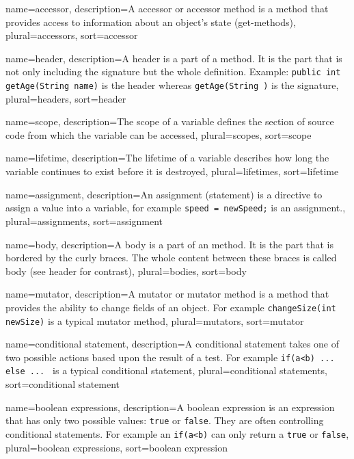 {
	name=accessor,
	description={A accessor or accessor method is a method that provides
		access to information about an object's state (get-methods)},
	plural=accessors,
	sort=accessor
}

{
	name=header,
	description={A header is a part of a method. It is the part that is
		not only including the signature but the whole definition.
		Example: \lstinline{public int getAge(String name)} is the
		header whereas \lstinline{getAge(String )} is the signature},
	plural=headers,
	sort=header
}

{
	name=scope,
	description={The scope of a variable defines the section of source
		code from which the variable can be accessed},
	plural=scopes,
	sort=scope
}

{
	name=lifetime,
	description={The lifetime of a variable describes how long the
		variable continues to exist before it is destroyed},
	plural=lifetimes,
	sort=lifetime
}

{
	name=assignment,
	description={An assignment (statement) is a directive to assign a
		value into a variable, for example 
		\lstinline{speed = newSpeed;} is an assignment.},
	plural=assignments,
	sort=assignment
}

{
	name=body,
	description={A body is a part of an method. It is the part that is
		bordered by the curly braces. The whole content between these
		braces is called body (see header for contrast)},
	plural=bodies,
	sort=body
}

{
	name=mutator,
	description={A mutator or mutator method is a method that provides
		the ability to change fields of an object. For example
		\lstinline?changeSize(int newSize)? is a typical mutator
		method},
	plural=mutators,
	sort=mutator
}

{
	name=conditional statement,
	description={A conditional statement takes one of two possible actions
		based upon the result of a test. For example 
		\lstinline?if(a<b) ... else ... ? is a typical conditional 
		statement},
	plural=conditional statements,
	sort=conditional statement
}

{
	name=boolean expressions,
	description={A boolean expression is an expression that has only two
		possible values: \lstinline?true? or \lstinline?false?.
		They are often controlling conditional statements. For example
		an \lstinline?if(a<b)? can only return a \lstinline?true? or
		\lstinline?false?},
	plural=boolean expressions,
	sort=boolean expression
}


